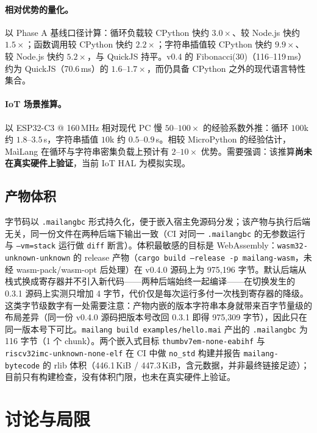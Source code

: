 \documentclass[10pt,a4paper]{article}
\begin{document}
\paragraph{相对优势的量化。}
以 Phase A 基线口径计算：循环负载较 CPython 快约 $3.0\times$、较 Node.js 快约 $1.5\times$；函数调用较 CPython 快约 $2.2\times$；字符串插值较 CPython 快约 $9.9\times$、较 Node.js 快约 $5.2\times$，与 QuickJS 持平。v0.4 的 Fibonacci(30)（116--119\,ms）约为 QuickJS（70.6\,ms）的 $1.6$--$1.7\times$，而仍具备 CPython 之外的现代语言特性集合。

\paragraph{IoT 场景推算。}
以 ESP32-C3 @ 160\,MHz 相对现代 PC 慢 $50$--$100\times$ 的经验系数外推：循环 $100$k 约 $1.8$--$3.5$\,s，字符串插值 $10$k 约 $0.5$--$0.9$\,s。相较 MicroPython 的经验估计，MaìLang 在循环与字符串密集负载上预计有 $2$--$10\times$ 优势。需要强调：该推算\textbf{尚未在真实硬件上验证}，当前 IoT HAL 为模拟实现。

\subsection{产物体积}

字节码以 \texttt{.mailangbc} 形式持久化，便于嵌入宿主免源码分发；该产物与执行后端无关，同一份文件在两种后端下输出一致（CI 对同一 \texttt{.mailangbc} 的无参数运行与 \texttt{--vm=stack} 运行做 \texttt{diff} 断言）。体积最敏感的目标是 WebAssembly：\texttt{wasm32-unknown-unknown} 的 release 产物（\texttt{cargo build --release -p mailang-wasm}，未经 wasm-pack/wasm-opt 后处理）在 v0.4.0 源码上为 975{,}196 字节。默认后端从栈式换成寄存器并不引入新代码——两种后端始终一起编译——在切换发生的 0.3.1 源码上实测只增加 4 字节，代价仅是每次运行多付一次栈到寄存器的降级。这类字节级数字有一处需要注意：产物内嵌的版本字符串本身就带来百字节量级的布局差异（同一份 v0.4.0 源码把版本号改回 0.3.1 即得 975{,}309 字节），因此只在同一版本号下可比。\texttt{mailang build examples/hello.mai} 产出的 \texttt{.mailangbc} 为 116 字节（1 个 chunk）。两个嵌入式目标 \texttt{thumbv7em-none-eabihf} 与 \texttt{riscv32imc-unknown-none-elf} 在 CI 中做 \texttt{no\_std} 构建并报告 \texttt{mailang-bytecode} 的 rlib 体积（446.1\,KiB / 447.3\,KiB，含元数据，并非最终链接足迹）；目前只有构建检查，没有体积门限，也未在真实硬件上验证。

\section{讨论与局限}
\label{sec:limits}
\end{document}
